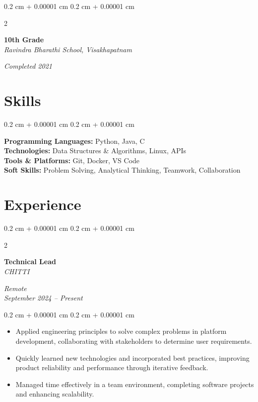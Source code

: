 \documentclass[10pt, letterpaper]{article}
\newenvironment{highlights}{
    \begin{itemize}[
        topsep=0.10 cm,
        parsep=0.10 cm,
        partopsep=0pt,
        itemsep=0pt,
        leftmargin=0.4 cm + 10pt
    ]
}{
    \end{itemize}
} %
\newenvironment{onecolentry}{
    \begin{adjustwidth}{
        0.2 cm + 0.00001 cm
    }{
        0.2 cm + 0.00001 cm
    }
}{
    \end{adjustwidth}
} %
\newenvironment{twocolentry}[2][]{
    \onecolentry
    \def\secondColumn{#2}
    \setcolumnwidth{\fill, 4.5 cm}
    \begin{paracol}{2}
}{
    \switchcolumn \raggedleft \secondColumn
    \end{paracol}
    \endonecolentry
} %
\begin{document}
    \vspace{0.10 cm}
    \begin{twocolentry}{
        \textit{Completed 2021}
    }
        \textbf{10th Grade} \\
        \textit{Ravindra Bharathi School, Visakhapatnam}
    \end{twocolentry}

    \section{Skills}
    \begin{onecolentry}
        \textbf{Programming Languages:} Python, Java, C \\
        \textbf{Technologies:} Data Structures \& Algorithms, Linux, APIs \\
        \textbf{Tools \& Platforms:} Git, Docker, VS Code \\
        \textbf{Soft Skills:} Problem Solving, Analytical Thinking, Teamwork, Collaboration
    \end{onecolentry}

    \section{Experience}
    \begin{twocolentry}{
        \textit{Remote} \\
        \textit{September 2024 – Present}
    }
        \textbf{Technical Lead} \\
        \textit{CHITTI}
    \end{twocolentry}
    \vspace{0.10 cm}
    \begin{onecolentry}
        \begin{highlights}
            \item Applied engineering principles to solve complex problems in platform development, collaborating with stakeholders to determine user requirements.
            \item Quickly learned new technologies and incorporated best practices, improving product reliability and performance through iterative feedback.
            \item Managed time effectively in a team environment, completing software projects and enhancing scalability.
        \end{highlights}
    \end{onecolentry}
\end{document}

